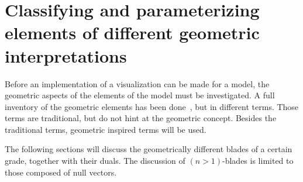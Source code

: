 \section{Classifying and parameterizing elements of different geometric interpretations}
\label{ch:research}

Before an implementation of a visualization can be made for a model, the geometric aspects of the elements of the model must be investigated.  A full inventory of the geometric elements has been done~\cite[Chapter 3]{Pottmann}, but in different terms.  Those terms are traditional, but do not hint at the geometric concept.  Besides the traditional terms, geometric inspired terms will be used.  

The following sections will discuss the geometrically different blades of a certain grade, together with their duals.  The discussion of $(n>1)$-blades is limited to those composed of null vectors.  
%
%    


